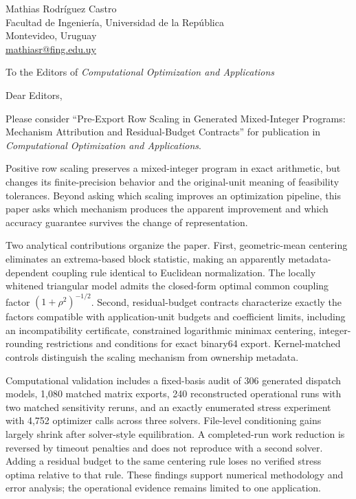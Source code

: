 \documentclass[11pt]{article}
\begin{document}
\noindent Mathias Rodr\'iguez Castro\\
Facultad de Ingenier\'ia, Universidad de la Rep\'ublica\\
Montevideo, Uruguay\\
\href{mailto:mathiasr@fing.edu.uy}{mathiasr@fing.edu.uy}

\bigskip
\noindent To the Editors of \emph{Computational Optimization and Applications}

\bigskip
\noindent Dear Editors,

\medskip
Please consider ``Pre-Export Row Scaling in Generated Mixed-Integer Programs: Mechanism
Attribution and Residual-Budget Contracts'' for publication in \emph{Computational Optimization
and Applications}.

Positive row scaling preserves a mixed-integer program in exact arithmetic, but changes its
finite-precision behavior and the original-unit meaning of feasibility tolerances. Beyond
asking which scaling improves an optimization pipeline, this paper asks which mechanism
produces the apparent improvement and which accuracy guarantee survives the change of
representation.

Two analytical contributions organize the paper. First, geometric-mean centering eliminates
an extrema-based block statistic, making an apparently metadata-dependent coupling rule
identical to Euclidean normalization. The locally whitened triangular model admits the
closed-form optimal common coupling factor $(1+\rho^2)^{-1/2}$. Second, residual-budget
contracts characterize exactly the factors compatible with application-unit budgets and
coefficient limits, including an incompatibility certificate, constrained logarithmic minimax
centering, integer-rounding restrictions and conditions for exact binary64 export.
Kernel-matched controls distinguish the scaling mechanism from ownership metadata.

Computational validation includes a fixed-basis audit of 306 generated dispatch models,
1{,}080 matched matrix exports, 240 reconstructed operational runs with two matched
sensitivity reruns, and an exactly enumerated stress experiment with 4{,}752 optimizer calls
across three solvers. File-level conditioning gains largely shrink after solver-style
equilibration. A completed-run work reduction is reversed by timeout penalties and does not
reproduce with a second solver. Adding a residual budget to the same centering rule loses
no verified stress optima relative to that rule. These findings support numerical methodology
and error analysis; the operational evidence remains limited to one application.
\end{document}
